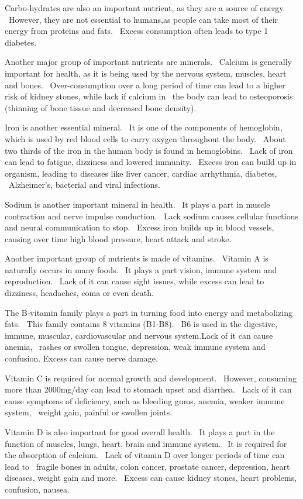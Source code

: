Carbo-hydrates are also an important nutrient, as they are a source of energy. \
However, they are not essential to humans,as people can take most of their energy from proteins and fats. \
Excess consumption often leads to type 1 diabetes.

Another major group of important nutrients are minerals. \
Calcium is generally important for health, as it is being used by the nervous system, muscles, heart and bones. \
Over-consumption over a long period of time can lead to a higher risk of kidney stones, while lack if calcium in \
the body can lead to osteoporosis (thinning of bone tissue and decreased bone density).

Iron is another essential mineral. \
It is one of the components of hemoglobin, which is used by red blood cells to carry oxygen throughout the body. \
About two thirds of the iron in the human body is found in hemoglobins. \
Lack of iron can lead to fatigue, dizziness and lowered immunity. \
Excess iron can build up in organism, leading to diseases like liver cancer, cardiac arrhythmia, diabetes, \
Alzheimer's, bacterial and viral infections.

Sodium is another important mineral in health. \
It plays a part in muscle contraction and nerve impulse conduction. \
Lack sodium causes cellular functions and neural communication to stop. \
Excess iron builds up in blood vessels, causing over time high blood pressure, heart attack and stroke.

Another important group of nutrients is made of vitamins. \
Vitamin A is naturally occurs in many foods. \
It plays a part vision, immune system and reproduction. \
Lack of it can cause sight issues, while excess can lead to dizziness, headaches, coma or even death.

The B-vitamin family plays a part in turning food into energy and metabolizing fats. \
This family contains 8 vitamins (B1-B8). \
B6 is used in the digestive, immune, muscular, cardiovascular and nervous system.Lack of it can cause anemia, \
rashes or swollen tongue, depression, weak immune system and confusion.
Excess can cause nerve damage.

Vitamin C is required for normal growth and development. \
However, consuming more than 2000mg/day can lead to stomach upset and diarrhea. \
Lack of it can cause symptoms of deficiency, such as bleeding gums, anemia, weaker immune system, \
weight gain, painful or swollen joints.

Vitamin D is also important for good overall health. \
It plays a part in the function of muscles, lungs, heart, brain and immune system. \
It is required for the absorption of calcium. \
Lack of vitamin D over longer periods of time can lead to \
fragile bones in adults, colon cancer, prostate cancer, depression, heart diseases, weight gain and more. \
Excess can cause kidney stones, heart problems, confusion, nausea.



